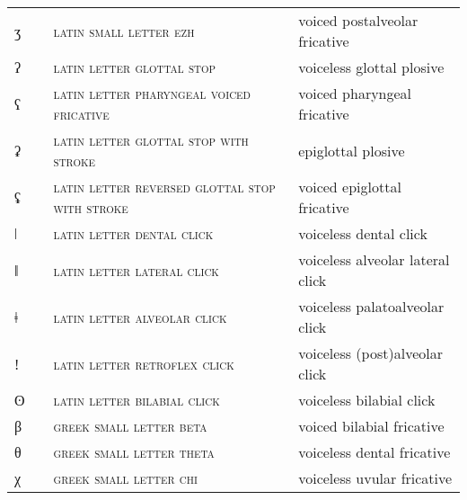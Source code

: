 \begin{center}
\begin{xtabular}{ l L{1.2cm} L{5.4cm} L{4.2cm} }
ʒ &  & \textsc{latin small letter ezh} & voiced postalveolar fricative \\ 
ʔ &  & \textsc{latin letter glottal stop} & voiceless glottal plosive \\ 
ʕ &  & \textsc{latin letter pharyngeal voiced fricative} & voiced pharyngeal fricative \\ 
ʡ &  & \textsc{latin letter glottal stop with stroke} & epiglottal plosive \\ 
ʢ &  & \textsc{latin letter reversed glottal stop with stroke} & voiced epiglottal fricative \\ 
ǀ &  & \textsc{latin letter dental click} & voiceless dental click \\ 
ǁ &  & \textsc{latin letter lateral click} & voiceless alveolar lateral click \\ 
ǂ &  & \textsc{latin letter alveolar click} & voiceless palatoalveolar click \\ 
ǃ &  & \textsc{latin letter retroflex click} & voiceless (post)alveolar click \\ 
ʘ &  & \textsc{latin letter bilabial click} & voiceless bilabial click \\ 
β &  & \textsc{greek small letter beta} & voiced bilabial fricative \\ 
θ &  & \textsc{greek small letter theta} & voiceless dental fricative \\ 
χ &  & \textsc{greek small letter chi} & voiceless uvular fricative \\
\end{xtabular}
\end{center}
